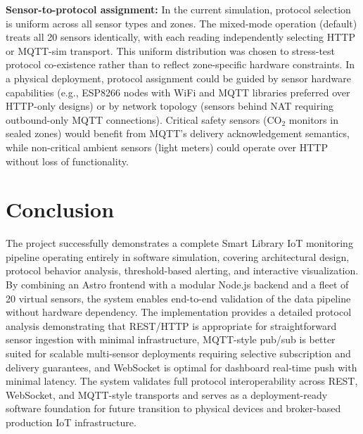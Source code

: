 \documentclass[12pt,a4paper]{article}
\begin{document}
\textbf{Sensor-to-protocol assignment:} In the current simulation, protocol selection is uniform across all sensor types and zones. The mixed-mode operation (default) treats all 20 sensors identically, with each reading independently selecting HTTP or MQTT-sim transport. This uniform distribution was chosen to stress-test protocol co-existence rather than to reflect zone-specific hardware constraints. In a physical deployment, protocol assignment could be guided by sensor hardware capabilities (e.g., ESP8266 nodes with WiFi and MQTT libraries preferred over HTTP-only designs) or by network topology (sensors behind NAT requiring outbound-only MQTT connections). Critical safety sensors (CO$_2$ monitors in sealed zones) would benefit from MQTT's delivery acknowledgement semantics, while non-critical ambient sensors (light meters) could operate over HTTP without loss of functionality.

\section*{Conclusion}
The project successfully demonstrates a complete Smart Library IoT monitoring pipeline operating entirely in software simulation, covering architectural design, protocol behavior analysis, threshold-based alerting, and interactive visualization. By combining an Astro frontend with a modular Node.js backend and a fleet of 20 virtual sensors, the system enables end-to-end validation of the data pipeline without hardware dependency. The implementation provides a detailed protocol analysis demonstrating that REST/HTTP is appropriate for straightforward sensor ingestion with minimal infrastructure, MQTT-style pub/sub is better suited for scalable multi-sensor deployments requiring selective subscription and delivery guarantees, and WebSocket is optimal for dashboard real-time push with minimal latency. The system validates full protocol interoperability across REST, WebSocket, and MQTT-style transports and serves as a deployment-ready software foundation for future transition to physical devices and broker-based production IoT infrastructure.
\end{document}
